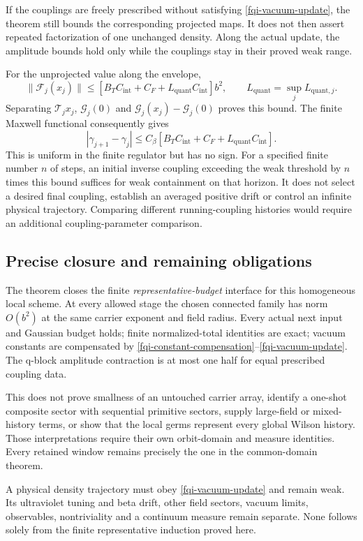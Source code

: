 If the couplings are freely prescribed without satisfying
\eqref{fqi-vacuum-update}, the theorem still bounds the
corresponding projected maps. It does not then assert
repeated factorization of one unchanged density. Along
the actual update, the amplitude bounds hold only while
the couplings stay in their proved weak range.

For the unprojected value along the envelope,
\begin{equation}
 \|\mathcal F_j(x_j)\|
 \le[B_TC_{\mathrm{int}}+C_F+L_{\mathrm{quant}}C_{\mathrm{int}}]b^2,
 \qquad L_{\mathrm{quant}}=\sup_j L_{\mathrm{quant},j}.
 \label{fqi-unprojected-bound}
\end{equation}
Separating $\mathcal T_jx_j$, $\mathcal G_j(0)$ and
$\mathcal G_j(x_j)-\mathcal G_j(0)$ proves this bound.
The finite Maxwell functional consequently gives
\begin{equation}
 |\gamma_{j+1}-\gamma_j|
 \le C_\beta[B_TC_{\mathrm{int}}+C_F
                              +L_{\mathrm{quant}}C_{\mathrm{int}}].
 \label{fqi-increment-bound}
\end{equation}
This is uniform in the finite regulator but has no sign.
For a specified finite number $n$ of steps, an initial
inverse coupling exceeding the weak threshold by $n$ times
this bound suffices for weak containment on that horizon.
It does not select a desired final coupling, establish an
averaged positive drift or control an infinite physical
trajectory. Comparing different running-coupling histories
would require an additional coupling-parameter comparison.

\subsection{Precise closure and remaining obligations}
\label{fqi-scope-section}

The theorem closes the finite \emph{representative-budget}
interface for this homogeneous local scheme. At every allowed
stage the chosen connected family has norm $O(b^2)$ at the
same carrier exponent and field radius. Every actual next
input and Gaussian budget holds; finite normalized-total
identities are exact; vacuum constants are compensated by
\eqref{fqi-constant-compensation}--\eqref{fqi-vacuum-update}.
The q-block amplitude contraction is at most one half for
equal prescribed coupling data.

This does not prove smallness of an untouched carrier array,
identify a one-shot composite sector with sequential primitive
sectors, supply large-field or mixed-history terms, or show
that the local germs represent every global Wilson history.
Those interpretations require their own orbit-domain and
measure identities. Every retained window remains precisely
the one in the common-domain theorem.

A physical density trajectory must obey
\eqref{fqi-vacuum-update} and remain weak. Its ultraviolet
tuning and beta drift, other field sectors, vacuum limits,
observables, nontriviality and a continuum measure remain
separate. None follows solely from the finite representative
induction proved here.
